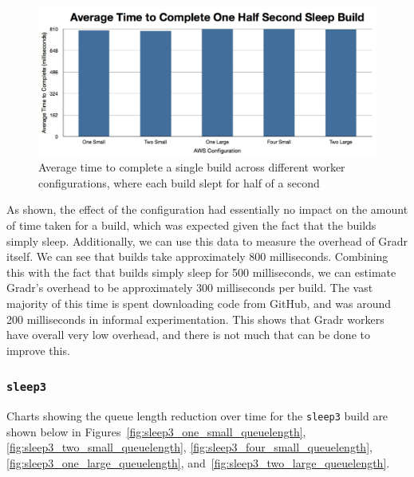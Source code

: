 \documentclass{scrartcl}
\begin{document}
\begin{figure}[here]
  \begin{center}
    \includegraphics[scale=0.45]{raw_data/sleep0.5/time_to_complete_each.jpg}
  \end{center}
  \caption{Average time to complete a single build across different worker configurations, where each build slept for half of a second}
  \label{fig:sleephalf_each}
\end{figure}

As shown, the effect of the configuration had essentially no impact on the amount of time taken for a build, which was expected given the fact that the builds simply sleep.
Additionally, we can use this data to measure the overhead of Gradr itself.
We can see that builds take approximately 800 milliseconds.
Combining this with the fact that builds simply sleep for 500 milliseconds, we can estimate Gradr's overhead to be approximately 300 milliseconds per build.
The vast majority of this time is spent downloading code from GitHub, and was around 200 milliseconds in informal experimentation.
This shows that Gradr workers have overall very low overhead, and there is not much that can be done to improve this.

\subsubsection{\texttt{sleep3}}
\label{sec:sleep3}

Charts showing the queue length reduction over time for the \texttt{sleep3} build are shown below in Figures~\ref{fig:sleep3_one_small_queuelength}, \ref{fig:sleep3_two_small_queuelength}, \ref{fig:sleep3_four_small_queuelength}, \ref{fig:sleep3_one_large_queuelength}, and~\ref{fig:sleep3_two_large_queuelength}.
\end{document}
